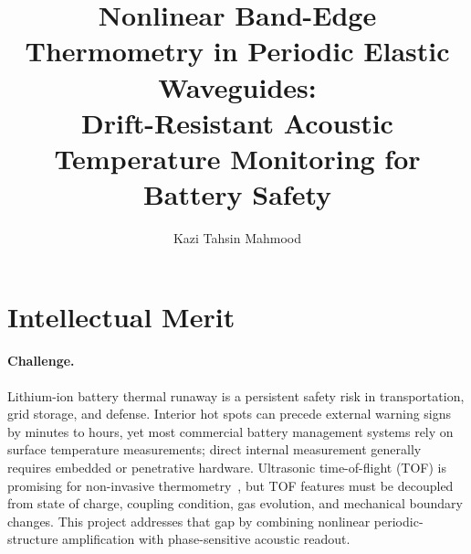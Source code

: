 \documentclass[11pt]{article}
\title{Nonlinear Band-Edge Thermometry in Periodic Elastic Waveguides:\\
Drift-Resistant Acoustic Temperature Monitoring for Battery Safety}
\author{Kazi Tahsin Mahmood}
\affil{Department of Mechanical Engineering, Wayne State University}
\date{}
\begin{document}
\maketitle

\section{Intellectual Merit}

\paragraph{Challenge.}
Lithium-ion battery thermal runaway is a persistent safety risk in transportation, grid storage, and defense. Interior hot spots can precede external warning signs by minutes to hours, yet most commercial battery management systems rely on surface temperature measurements; direct internal measurement generally requires embedded or penetrative hardware. Ultrasonic time-of-flight (TOF) is promising for non-invasive thermometry~\cite{Cheng2024,Williams2024}, but TOF features must be decoupled from state of charge, coupling condition, gas evolution, and mechanical boundary changes. This project addresses that gap by combining nonlinear periodic-structure amplification with phase-sensitive acoustic readout.
\end{document}

